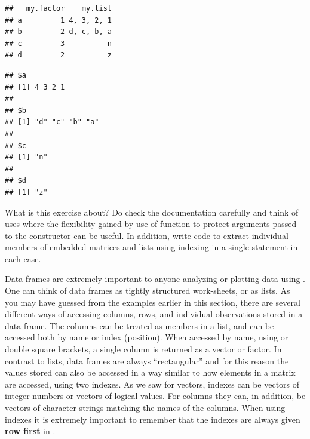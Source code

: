 \documentclass[krantz2]{krantz}\usepackage{knitr}
\begin{document}
\begin{advplayground}
\begin{knitrout}\footnotesize
{}\color{fgcolor}\begin{kframe}
\begin{alltt}
\hlkwb{<-}  
\end{alltt}
\begin{verbatim}
##   my.factor    my.list
## a         1 4, 3, 2, 1
## b         2 d, c, b, a
## c         3          n
## d         2          z
\end{verbatim}
\begin{alltt}
\hlopt{$}
\end{alltt}
\begin{verbatim}
## $a
## [1] 4 3 2 1
## 
## $b
## [1] "d" "c" "b" "a"
## 
## $c
## [1] "n"
## 
## $d
## [1] "z"
\end{verbatim}
\end{kframe}
\end{knitrout}

What is this exercise about? Do check the documentation carefully and think of uses where the flexibility gained by use of function  to protect arguments passed to the  constructor can be useful. In addition, write code to extract individual members of embedded matrices and lists using indexing in a single \Rlang statement in each case.
\end{advplayground}

Data frames are extremely important to anyone analyzing or plotting data using \Rlang. One can think of data frames as tightly structured work-sheets, or as lists. As you may have guessed from the examples earlier in this section, there are several different ways of accessing columns, rows, and individual observations stored in a data frame. The columns can be treated as members in a list, and can be accessed both by name or index (position). When accessed by name, using \Roperator{\$} or double square brackets, a single column is returned as a vector or factor. In contrast to lists, data frames are always ``rectangular'' and for this reason the values stored can also be accessed in a way similar to how elements in a matrix are accessed, using two indexes. As we saw for vectors, indexes can be vectors of integer numbers or vectors of logical values. For columns they can, in addition, be vectors of character strings matching the names of the columns. When using indexes it is extremely important to remember that the indexes are always given \textbf{row first} in \Rlang.
\end{document}
